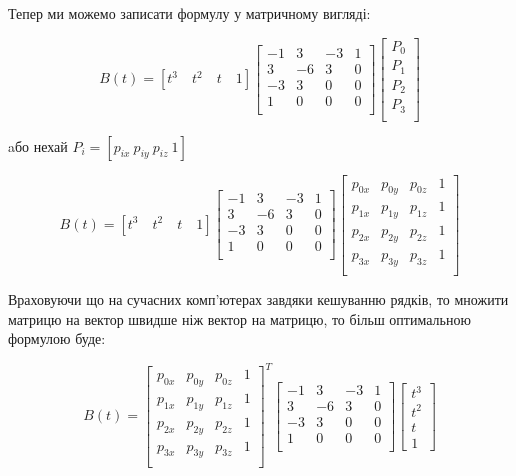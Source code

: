 \let\mypdfximage\pdfximage\def\pdfximage{\immediate\mypdfximage}\documentclass[14pt,a4paper]{extarticle}
\theoremstyle{definition}
\renewcommand{\[}{\begin{singlespace}\begin{equation*}}
\renewcommand{\]}{\end{equation*}\end{singlespace}}
\renewcommand{\+}{\discretionary{\mbox{\scriptsize$\hookleftarrow$}}{}{}}
\begin{document}
Тепер ми можемо записати формулу у матричному вигляді:
\[B(t)=[t^3\quad t^2\quad t\quad 1]\left[\begin{matrix}
-1 &  3 & -3 & 1 \\
 3 & -6 &  3 & 0 \\
-3 &  3 &  0 & 0 \\
 1 &  0 &  0 & 0 \\
\end{matrix}\right]\left[\begin{matrix}
P_0 \\ P_1 \\ P_2 \\ P_3 \\
\end{matrix}\right]\]
aбо нехай $P_i = [p_{ix}\ p_{iy}\ p_{iz}\ 1]$
\[B(t)=[t^3\quad t^2\quad t\quad 1]\left[\begin{matrix}
-1 &  3 & -3 & 1 \\
 3 & -6 &  3 & 0 \\
-3 &  3 &  0 & 0 \\
 1 &  0 &  0 & 0 \\
\end{matrix}\right]\left[\begin{matrix}
p_{0x} & p_{0y} & p_{0z} & 1 \\
p_{1x} & p_{1y} & p_{1z} & 1 \\
p_{2x} & p_{2y} & p_{2z} & 1 \\
p_{3x} & p_{3y} & p_{3z} & 1 \\
\end{matrix}\right]\]

Враховуючи що на сучасних комп'ютерах завдяки кешуванню рядків, то множити матрицю на вектор швидше ніж вектор на матрицю, то більш оптимальною формулою буде: 
\[B(t)=\left[\begin{matrix}
p_{0x} & p_{0y} & p_{0z} & 1 \\
p_{1x} & p_{1y} & p_{1z} & 1 \\
p_{2x} & p_{2y} & p_{2z} & 1 \\
p_{3x} & p_{3y} & p_{3z} & 1 \\
\end{matrix}\right]^T\left[\begin{matrix}
-1 &  3 & -3 & 1 \\
 3 & -6 &  3 & 0 \\
-3 &  3 &  0 & 0 \\
 1 &  0 &  0 & 0 \\
\end{matrix}\right]\left[\begin{matrix}t^3\\t^2\\t\\1\end{matrix}\right]\]
\end{document}
